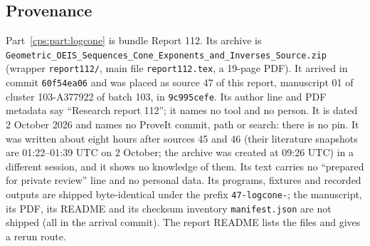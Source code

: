 \documentclass[11pt,letterpaper]{article}
\numberwithin{equation}{section}
\theoremstyle{remark}\newtheorem{remark}[theorem]{Remark}
\begin{document}
\subsection{Provenance}\label{cps:log:sec:provenance}
Part~\ref{cps:part:logcone} is bundle Report 112. Its archive is
\texttt{Geometric\_OEIS\_\allowbreak Sequences\_Cone\_\allowbreak Exponents\_and\_\allowbreak Inverses\_Source.zip}
(wrapper \texttt{report112/}, main file \texttt{report112.tex}, a 19-page PDF). It arrived in
commit \texttt{60f54ea06} and was placed as source 47 of this report, manuscript 01 of
cluster 103-A377922 of batch 103, in \texttt{9c995cefe}. Its author line and PDF metadata say
``Research report 112''; it names no tool and no person. It is dated 2 October 2026 and names no
ProveIt commit, path or search: there is no pin. It was written about eight hours after
sources 45 and 46 (their literature snapshots are 01:22--01:39 UTC on 2 October; the archive was
created at 09:26 UTC) in a different session, and it shows no knowledge of them. Its text
carries no ``prepared for private review'' line and no personal data. Its programs, fixtures and
recorded outputs are shipped byte-identical under the prefix \texttt{47-logcone-}; the
manuscript, its PDF, its README and its checksum inventory \texttt{manifest.json} are not
shipped (all in the arrival commit). The report README lists the files and gives a rerun
route.
\end{document}
